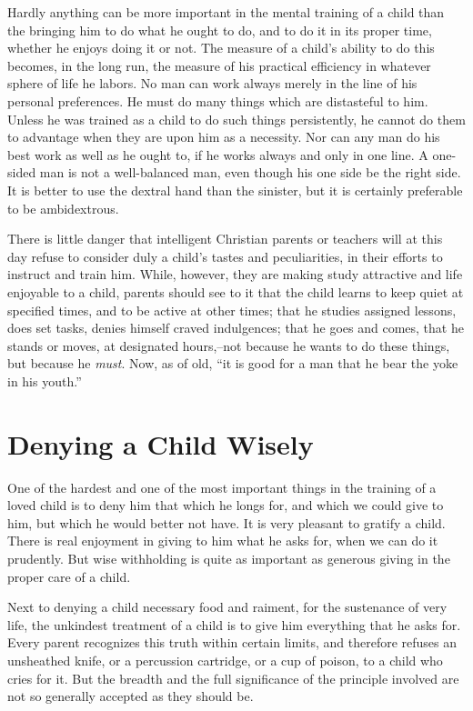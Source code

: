 \documentclass[
]{book}
\begin{document}
Hardly anything can be more important in the mental training of a child than the bringing him to do what he ought to do, and to do it in its proper time, whether he enjoys doing it or not. The measure of a child's ability to do this becomes, in the long run, the measure of his practical efficiency in whatever sphere of life he labors. No man can work always merely in the line of his personal preferences. He must do many things which are distasteful to him. Unless he was trained as a child to do such things persistently, he cannot do them to advantage when they are upon him as a necessity. Nor can any man do his best work as well as he ought to, if he works always and only in one line. A one-sided man is not a well-balanced man, even though his one side be the right side. It is better to use the dextral hand than the sinister, but it is certainly preferable to be ambidextrous.

There is little danger that intelligent Christian parents or teachers will at this day refuse to consider duly a child's tastes and peculiarities, in their efforts to instruct and train him. While, however, they are making study attractive and life enjoyable to a child, parents should see to it that the child learns to keep quiet at specified times, and to be active at other times; that he studies assigned lessons, does set tasks, denies himself craved indulgences; that he goes and comes, that he stands or moves, at designated hours,--not because he wants to do these things, but because he \emph{must}. Now, as of old, ``it is good for a man that he bear the yoke in his youth.''

\hypertarget{denying-a-child-wisely}{%
\chapter{Denying a Child Wisely}\label{denying-a-child-wisely}}

One of the hardest and one of the most important things in the training of a loved child is to deny him that which he longs for, and which we could give to him, but which he would better not have. It is very pleasant to gratify a child. There is real enjoyment in giving to him what he asks for, when we can do it prudently. But wise withholding is quite as important as generous giving in the proper care of a child.

Next to denying a child necessary food and raiment, for the sustenance of very life, the unkindest treatment of a child is to give him everything that he asks for. Every parent recognizes this truth within certain limits, and therefore refuses an unsheathed knife, or a percussion cartridge, or a cup of poison, to a child who cries for it. But the breadth and the full significance of the principle involved are not so generally accepted as they should be.
\end{document}
